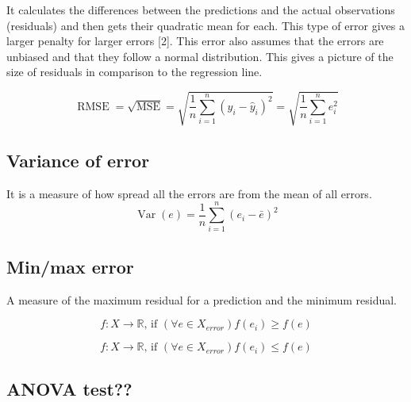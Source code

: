 \documentclass[
  letterpaper,
  DIV=11,
  numbers=noendperiod]{scrreprt}
\begin{document}
It calculates the differences between the predictions and the actual
observations (residuals) and then gets their quadratic mean for each.
This type of error gives a larger penalty for larger errors {[}2{]}.
This error also assumes that the errors are unbiased and that they
follow a normal distribution. This gives a picture of the size of
residuals in comparison to the regression line.

\[
\operatorname{RMSE}=\sqrt{\operatorname{MSE}}=\sqrt{\frac{1}{n}\sum_{i=1}^n (y_i-\hat{y}_i)^2}=\sqrt{\frac{1}{n}\sum_{i=1}^n e_i^2}
\]

\hypertarget{variance-of-error}{%
\subsection{Variance of error}\label{variance-of-error}}

It is a measure of how spread all the errors are from the mean of all
errors. \[
\operatorname{Var}(e)=\frac{1}{n}\sum_{i=1}^n(e_i-\bar{e})^2
\]

\hypertarget{minmax-error}{%
\subsection{Min/max error}\label{minmax-error}}

A measure of the maximum residual for a prediction and the minimum
residual.

\[
f: X \rightarrow \mathbb{R} \text {, if }(\forall e \in X_{error}) f\left(e_i\right) \geq f(e)
\]

\[
f: X \rightarrow \mathbb{R} \text {, if }(\forall e \in X_{error}) f\left(e_i\right) \leq f(e)
\]

\hypertarget{anova-test}{%
\subsection{ANOVA test??}\label{anova-test}}
\end{document}

